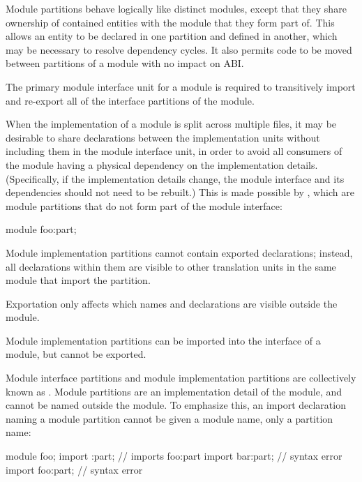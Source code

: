 \pnum
Module partitions behave logically like distinct modules,
except that they share ownership of contained entities
with the module that they form part of.
This allows an entity to be declared in one partition
and defined in another,
which may be necessary to resolve
dependency cycles.
It also permits code to be moved between partitions of a module
with no impact on ABI.

\pnum
The primary module interface unit for a module is required
to transitively import and re-export all of the interface
partitions of the module.

\pnum
When the implementation of a module is split across multiple files,
it may be desirable to share declarations between the implementation units
without including them in the module interface unit,
in order to avoid all consumers of the module
having a physical dependency on the implementation details.
(Specifically, if the implementation details change,
the module interface and its dependencies should not need to be rebuilt.)
This is made possible by ,
which are module partitions that do not form part of the module interface:

\begin{codeblock}
module foo:part;
\end{codeblock}

\pnum
Module implementation partitions cannot contain exported declarations;
instead, all declarations within them are visible to other translation
units in the same module that import the partition.
\begin{note}
Exportation only affects which names and declarations are visible outside
the module.
\end{note}

\pnum
Module implementation partitions can be imported
into the interface of a module,
but cannot be exported.

\pnum
Module interface partitions and module implementation partitions
are collectively known as .
Module partitions are an implementation detail of the module,
and cannot be named outside the module.
To emphasize this, an import declaration naming a module partition
cannot be given a module name, only a partition name:

\begin{codeblock}
module foo;
import :part;           // imports foo:part
import bar:part;        // syntax error
import foo:part;        // syntax error
\end{codeblock}

